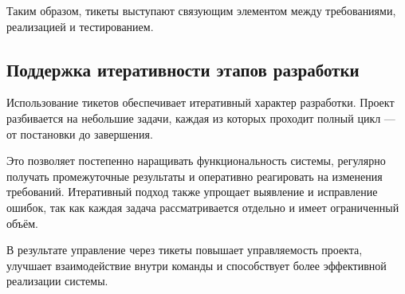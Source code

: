 \documentclass[14pt,a4paper]{extarticle}
\begin{document}
Таким образом, тикеты выступают связующим элементом между требованиями, реализацией и тестированием.

\subsection{Поддержка итеративности этапов разработки}

Использование тикетов обеспечивает итеративный характер разработки. Проект разбивается на небольшие задачи, каждая из которых проходит полный цикл — от постановки до завершения.

Это позволяет постепенно наращивать функциональность системы, регулярно получать промежуточные результаты и оперативно реагировать на изменения требований. Итеративный подход также упрощает выявление и исправление ошибок, так как каждая задача рассматривается отдельно и имеет ограниченный объём.

В результате управление через тикеты повышает управляемость проекта, улучшает взаимодействие внутри команды и способствует более эффективной реализации системы.
\end{document}
